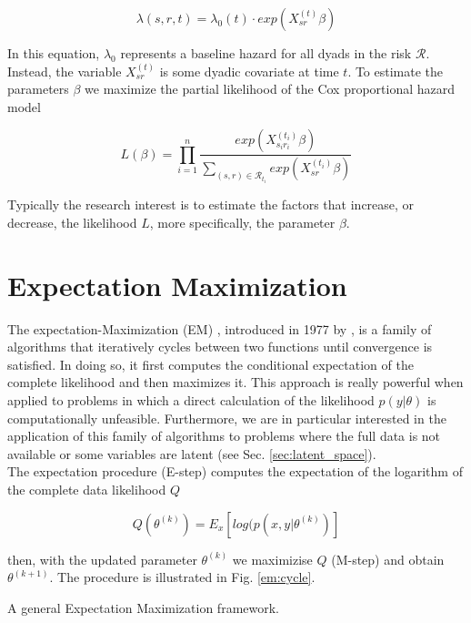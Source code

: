\documentclass[mscthesis]{usiinfthesis}
\begin{document}

\[
\lambda(s, r, t) = \lambda_0(t) \cdot exp({X_{sr}^{(t)} \beta} )
\]


In this equation, $\lambda_0$ represents a baseline hazard for all dyads in the risk $\mathcal{R}$. Instead, the variable $X_{sr}^{(t)}$ is some dyadic covariate at time $t$. To estimate the parameters $\beta$ we maximize the partial likelihood of the Cox proportional hazard model 


\[
L(\beta) =  \prod_{i=1}^n \frac{exp (X_{s_i r_i}^{(t_i)} \beta) }{ \sum_{(s,r) \in \mathcal{R}_{t_i}} exp({X_{sr}^{(t_i)} \beta} )}
\]

Typically the research interest is to estimate the factors that increase, or decrease, the likelihood $L$, more specifically, the parameter $\beta$.


\section{Expectation Maximization}
\label{sec:em}

The expectation-Maximization (EM) , introduced in 1977 by \citet{paper:dempster}, is a family of algorithms that iteratively cycles between two functions until convergence is satisfied. In doing so, it first computes the conditional expectation of the complete likelihood and then maximizes it. This approach is really powerful when applied to problems in which a direct calculation of the likelihood $p(y|\theta)$ is computationally unfeasible. Furthermore, we are in particular interested in the application of this family of algorithms to problems where the full data is not available or some variables are latent (see Sec. \ref{sec:latent_space}). \\

The expectation procedure (E-step) computes the expectation of the logarithm of the complete data likelihood $Q$

\[
Q(\theta^{(k)}) = E_{x} \left[ log(p(x, y | \theta^{(k)}) \right]
\]

then, with the updated parameter $\theta^{(k)}$ we maximizise $Q$ (M-step) and obtain $\theta^{(k+1)}$. The procedure is illustrated in Fig. \ref{em:cycle}. 

\begin{algorithm}[h]
  \label{em:cycle}
  \caption{A general Expectation Maximization framework.}
\end{algorithm}
\end{document}
